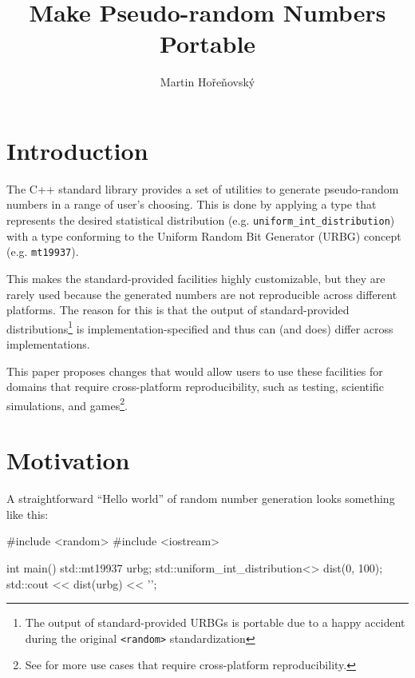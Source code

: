 \documentclass{wg21}
\title{Make Pseudo-random Numbers Portable}
\author{Martin Hořeňovský}{martin.horenovsky@gmail.com}
\begin{document}
\maketitle



\hypertarget{introduction}{%
    \section{Introduction}\label{introduction}}

The C++ standard library provides a set of utilities to generate
pseudo-random numbers in a range of user's choosing. This is done
by applying a type that represents the desired statistical distribution
(e.g. \texttt{uniform\_int\_distribution}) with a type conforming
to the Uniform Random Bit Generator (URBG) concept (e.g. \texttt{mt19937}).

This makes the standard-provided facilities highly customizable, but they
are rarely used because the generated numbers are not reproducible across
different platforms. The reason for this is that the output of
standard-provided distributions\footnote{The output of standard-provided
URBGs is portable due to a happy accident during the original
\texttt{<random>} standardization} is implementation-specified and thus
can (and does) differ across implementations.

This paper proposes changes that would allow users to use these facilities
for domains that require cross-platform reproducibility, such as testing,
scientific simulations, and games\footnote{See  for
more use cases that require cross-platform reproducibility.}.


\hypertarget{motivation}{%
    \section{Motivation}\label{motivation}}

A straightforward ``Hello world'' of random number generation looks something
like this:

\begin{codeblock}
#include <random>
#include <iostream>

int main() {
    std::mt19937 urbg;
    std::uniform_int_distribution<> dist(0, 100);
    std::cout << dist(urbg) << '\n';
}
\end{codeblock}
\end{document}
